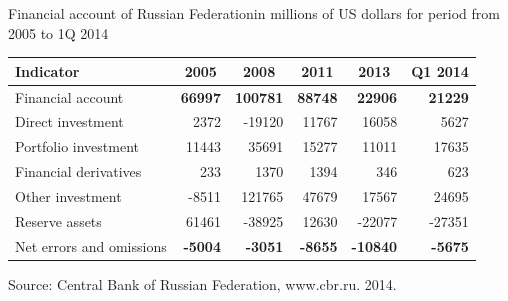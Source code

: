 \documentclass[international_finance_p1.tex]{subfiles}
\begin{document}
\begin{frame}[shrink=20]{Financial account of Russian Federation}{in millions of US dollars for period from 2005 to 1Q 2014}
\begin{table}[htbp]
  \centering
  \begin{tabularx}{\linewidth}[b]{@{}>{\raggedright\arraybackslash}Xrrrrr@{}}
    \toprule
    Indicator & \multicolumn{1}{c}{\textbf{2005}} & \multicolumn{1}{c}{\textbf{2008}} & \multicolumn{1}{c}{\textbf{2011}} & \multicolumn{1}{c}{\textbf{2013}} & \multicolumn{1}{c}{\textbf{Q1 2014}} \\
    \midrule
    \Large{Financial account} & \textbf{66997} & \textbf{100781} & \textbf{88748} & \textbf{22906} & \textbf{21229} \\
    \midrule
    Direct investment  & 2372  & -19120 & 11767 & 16058 & 5627 \\
    Portfolio investment  & 11443 & 35691 & 15277 & 11011 & 17635 \\
    Financial derivatives & 233   & 1370  & 1394  & 346   & 623 \\
    Other investment  & -8511 & 121765 & 47679 & 17567 & 24695 \\
    Reserve assets  & 61461 & -38925 & 12630 & -22077 & -27351 \\
    \midrule
    \Large{Net errors and omissions} & \textbf{-5004} & \textbf{-3051} & \textbf{-8655} & \textbf{-10840} & \textbf{-5675} \\
    \bottomrule
    \end{tabularx}%
  \label{tab:addlabel}%

\raggedright
Source: Central Bank of Russian Federation, www.cbr.ru. 2014.
\end{table}%
\end{frame}
\end{document}
